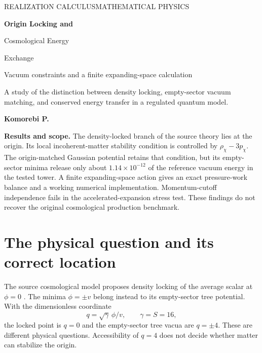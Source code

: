 \documentclass[11pt]{article}
\theoremstyle{definition}\newtheorem{definition}[theorem]{Definition}
\begin{document}
\thispagestyle{empty}
{\sffamily\small\color{teal}REALIZATION CALCULUS\hfill MATHEMATICAL PHYSICS\par}
\vspace{1.0in}
{\fontsize{29}{33}\selectfont\bfseries\color{navy}Origin Locking and\par Cosmological Energy\par Exchange\par}
\vspace{.25in}
{\Large Vacuum constraints and a finite expanding-space calculation\par}
\vspace{.25in}{\color{copper}\rule{1.2in}{1pt}\par}
\vspace{.2in}
\noindent A study of the distinction between density locking, empty-sector vacuum matching, and conserved energy transfer in a regulated quantum model.\par
\vspace{.38in}
\noindent\textbf{Komorebi P.}\par
\vfill
\noindent\textbf{Results and scope.} The density-locked branch of the source theory lies at the origin. Its local incoherent-matter stability condition is controlled by $\rho_\chi-3p_\chi$. The origin-matched Gaussian potential retains that condition, but its empty-sector minima release only about $1.14\times10^{-12}$ of the reference vacuum energy in the tested tower. A finite expanding-space action gives an exact pressure-work balance and a working numerical implementation. Momentum-cutoff independence fails in the accelerated-expansion stress test. These findings do not recover the original cosmological production benchmark.\par
\vspace{.25in}
\clearpage

\section{The physical question and its correct location}
The source cosmological model proposes density locking of the average scalar at $\phi=0$ \cite{bridge,cosmology}. The minima $\phi=\pm v$ belong instead to its empty-sector tree potential. With the dimensionless coordinate
\begin{equation}
q=\sqrt\gamma\,\phi/v,\qquad \gamma=S=16,
\end{equation}
the locked point is $q=0$ and the empty-sector tree vacua are $q=\pm4$. These are different physical questions. Accessibility of $q=4$ does not decide whether matter can stabilize the origin.
\end{document}
